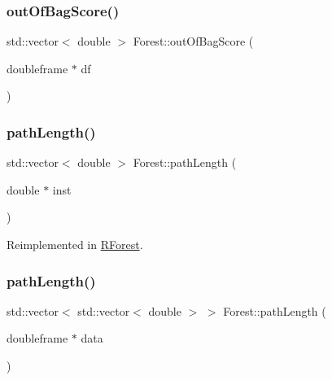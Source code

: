\mbox{\label{classForest_abc30331242d62253818f72585f757502}} 
\subsubsection{\texorpdfstring{out\+Of\+Bag\+Score()}{outOfBagScore()}}
{\footnotesize\ttfamily std\+::vector$<$ double $>$ Forest\+::out\+Of\+Bag\+Score (\begin{DoxyParamCaption}\item[{doubleframe $\ast$}]{df }\end{DoxyParamCaption})}

\mbox{\label{classForest_a8e3bac70e9f10ce6f301e297e32e8f5a}} 
\subsubsection{\texorpdfstring{path\+Length()}{pathLength()}\hspace{0.1cm}{\footnotesize\ttfamily [1/2]}}
{\footnotesize\ttfamily std\+::vector$<$ double $>$ Forest\+::path\+Length (\begin{DoxyParamCaption}\item[{double $\ast$}]{inst }\end{DoxyParamCaption})\hspace{0.3cm}{\ttfamily [virtual]}}



Reimplemented in \hyperlink{classRForest_ad2631b9a85a04079c603b1c8296bdb9d}{R\+Forest}.

\mbox{\label{classForest_af031c54e9e04b11c21c2b629d6bd0c5c}} 
\subsubsection{\texorpdfstring{path\+Length()}{pathLength()}\hspace{0.1cm}{\footnotesize\ttfamily [2/2]}}
{\footnotesize\ttfamily std\+::vector$<$ std\+::vector$<$ double $>$ $>$ Forest\+::path\+Length (\begin{DoxyParamCaption}\item[{doubleframe $\ast$}]{data }\end{DoxyParamCaption})}

